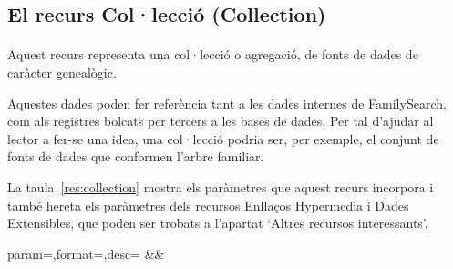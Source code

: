 \subsection{El recurs Col·lecció (Collection)}

    \paragraph{}
    Aquest recurs representa una col·lecció o agregació, de fonts de dades de caràcter genealògic.

    Aquestes dades poden fer referència tant a les dades internes de FamilySearch, com als registres bolcats per tercers a les bases de dades. Per tal d'ajudar al lector a fer-se una idea, una col·lecció podria ser, per exemple, el conjunt de fonts de dades que conformen l'arbre familiar.

    La taula~\ref{res:collection} mostra els paràmetres que aquest recurs incorpora i també hereta els paràmetres dels recursos Enllaços Hypermedia i Dades Extensibles, que poden ser trobats a l'apartat `Altres recursos interessants'.

    \begin{center}
             {param=\param,format=\format,desc=\desc}
             {\param&\format&\desc}
     \end{center}
